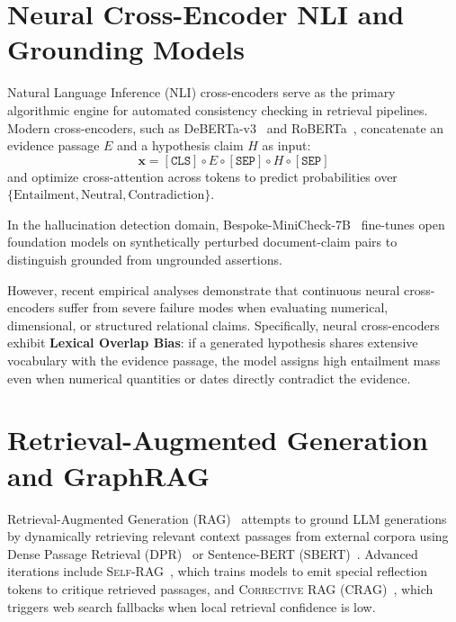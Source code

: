 \section{Neural Cross-Encoder NLI and Grounding Models}
\label{sec:cross_encoder_nli}

Natural Language Inference (NLI) cross-encoders serve as the primary algorithmic engine for automated consistency checking in retrieval pipelines. Modern cross-encoders, such as DeBERTa-v3~\cite{he2023deberta} and RoBERTa~\cite{liu2019roberta}, concatenate an evidence passage $E$ and a hypothesis claim $H$ as input:
\begin{equation}
    \mathbf{x} = [\texttt{CLS}] \circ E \circ [\texttt{SEP}] \circ H \circ [\texttt{SEP}]
\end{equation}
and optimize cross-attention across tokens to predict probabilities over $\{\text{Entailment}, \text{Neutral}, \text{Contradiction}\}$.

In the hallucination detection domain, Bespoke-MiniCheck-7B~\cite{niu2024ragtruth} fine-tunes open foundation models on synthetically perturbed document-claim pairs to distinguish grounded from ungrounded assertions. 

However, recent empirical analyses demonstrate that continuous neural cross-encoders suffer from severe failure modes when evaluating numerical, dimensional, or structured relational claims. Specifically, neural cross-encoders exhibit \textbf{Lexical Overlap Bias}: if a generated hypothesis shares extensive vocabulary with the evidence passage, the model assigns high entailment mass even when numerical quantities or dates directly contradict the evidence.

\section{Retrieval-Augmented Generation and GraphRAG}
\label{sec:rag_and_graphrag}

Retrieval-Augmented Generation (RAG)~\cite{lewis2020retrieval} attempts to ground LLM generations by dynamically retrieving relevant context passages from external corpora using Dense Passage Retrieval (DPR)~\cite{karpukhin2020dense} or Sentence-BERT (SBERT)~\cite{reimers2019sentencebert}. Advanced iterations include \textsc{Self-RAG}~\cite{asai2024selfrag}, which trains models to emit special reflection tokens to critique retrieved passages, and \textsc{Corrective RAG (CRAG)}~\cite{yan2024corrective}, which triggers web search fallbacks when local retrieval confidence is low.

